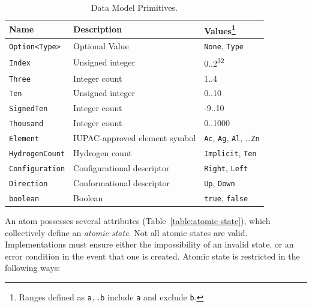 \documentclass{article}
\def\ttt{\texttt}
\begin{document}
\begin{table}
\begin{minipage}{\textwidth}
\renewcommand*\footnoterule{}
\caption{Data Model Primitives.}
\label{table:primitives}
\centering
\begin{tabular}{l l l}
    \hline
    Name & Description & Values\footnote{Ranges defined as \ttt{a..b} include \ttt{a} and exclude \ttt{b}.} \\
    \hline
    \ttt{Option<Type>} & Optional Value & \ttt{None}, \ttt{Type} \\
    \ttt{Index} & Unsigned integer & 0..2\textsuperscript{32} \\
    \ttt{Three} & Integer count & 1..4 \\
    \ttt{Ten} & Unsigned integer & 0..10 \\
    \ttt{SignedTen} & Integer count & -9..10 \\
    \ttt{Thousand} & Integer count & 0..1000 \\
    \ttt{Element} & IUPAC-\-approved element symbol & \ttt{Ac}, \ttt{Ag}, \ttt{Al}, {\ldots}\ttt{Zn}\\
    \ttt{HydrogenCount} & Hydrogen count & \ttt{Implicit}, \ttt{Ten} \\
    \ttt{Configuration} & Configurational descriptor & \ttt{Right}, \ttt{Left} \\
    \ttt{Direction} & Conformational descriptor & \ttt{Up}, \ttt{Down} \\
    \ttt{boolean} & Boolean & \ttt{true}, \ttt{false} \\
    \hline
\end{tabular}
\end{minipage}
\end{table}

An atom possesses several attributes (Table~\ref{table:atomic-state}), which collectively define an \textit{atomic state}. Not all atomic states are valid. Implementations must ensure either the impossibility of an invalid state, or an error condition in the event that one is created. Atomic state is restricted in the following ways:
\end{document}

